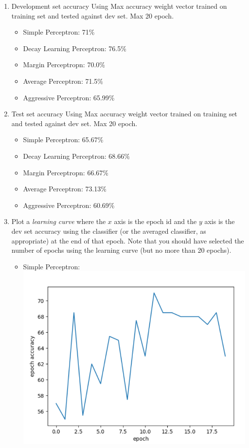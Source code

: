 \begin{enumerate}
\begin{enumerate}
  \item Development set accuracy
   Using Max accuracy weight vector trained on training set and tested against dev set. Max 20 epoch.
  \begin{itemize}
      \item Simple Perceptron: 71\%
      \item Decay Learning Perceptron: 76.5\%
      \item Margin Perceptropn: 70.0\%
      \item Average Perceptron: 71.5\%
      \item Aggressive Perceptron: 65.99\%
  \end{itemize}
  \item Test set accuracy
     Using Max accuracy weight vector trained on training set and tested against dev set. Max 20 epoch.
  \begin{itemize}
      \item Simple Perceptron: 65.67\%
      \item Decay Learning Perceptron: 68.66\%
      \item Margin Perceptropn: 66.67\%
      \item Average Perceptron: 73.13\%
      \item Aggressive Perceptron: 60.69\%
    \end{itemize}
  \item Plot a {\em learning curve} where the $x$ axis is the epoch id
    and the $y$ axis is the dev set accuracy using the classifier (or
    the averaged classifier, as appropriate) at the end of that
    epoch. Note that you should have selected the number of epochs
    using the learning curve (but no more than 20 epochs).
    \begin{itemize}
      \item Simple Perceptron:\\ \includegraphics{simpleP.PNG}

\end{itemize}
\end{enumerate}
\end{enumerate}

